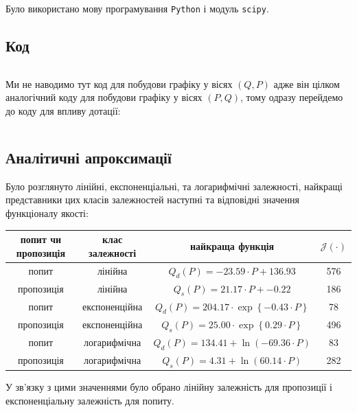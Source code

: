 Було використано мову програмування \texttt{Python} і модуль \texttt{scipy}.

\subsection{Код}

\inputminted[lastline=75]{python}{labs/examples/3/py/all.py}

Ми не наводимо тут код для побудови графіку у вісях $(Q, P)$ адже він цілком аналогічний коду для побудови графіку у вісях $(P,Q)$, тому одразу перейдемо до коду для впливу дотації:

\inputminted[firstline=100]{python}{labs/examples/3/py/all.py}

\subsection{Аналітичні апроксимації}

Було розглянуто лінійні, експоненціальні, та логарифмічні залежності, найкращі представники цих класів залежностей наступні та відповідні значення функціоналу якості:
\begin{table}[H]
	\centering
	\begin{tabular}{|c|c|c|c|} \hline
		попит чи пропозиція & клас залежності & найкраща функція & $\mathcal{J}(\cdot)$ \\ \hline
		попит & лінійна & $Q_d(P) = -23.59 \cdot P + 136.93$ & 576 \\ \hline
        пропозиція & лінійна & $Q_s(P) = 21.17 \cdot P + -0.22$ & 186 \\ \hline
        попит & експоненційна & $Q_d(P) = 204.17 \cdot \exp\left\{-0.43 \cdot P\right\}$ & 78 \\ \hline
        пропозиція & експоненційна & $Q_s(P) = 25.00 \cdot \exp\left\{0.29 \cdot P\right\}$& 496 \\ \hline
        попит & логарифмічна & $Q_d(P) = 134.41 + \ln(-69.36 \cdot P)$ & 83 \\ \hline
        пропозиція & логарифмічна & $Q_s(P) = 4.31 + \ln(60.14 \cdot P)$ & 282 \\ \hline
    \end{tabular}
\end{table}

У зв'язку з цими значеннями було обрано лінійну залежність для пропозиції і експоненціальну залежність для попиту.

